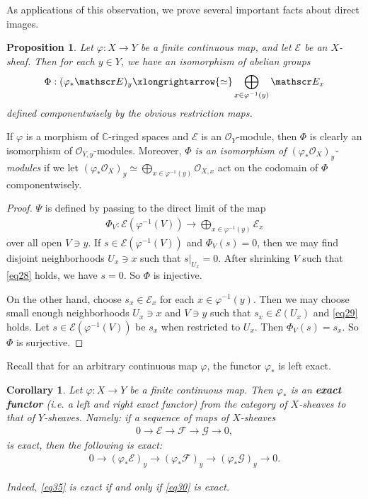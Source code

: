 \documentclass[12pt,b5paper,notitlepage]{report}
\theoremstyle{definition}
\theoremstyle{plain}
\newtheorem{pp}[df]{Proposition}
\newtheorem{co}[df]{Corollary}
\newcommand{\scr}{\mathscr}
\newcommand{\Cbb}{\mathbb C}
\numberwithin{equation}{section}
\begin{document}
As applications of this observation, we prove several important facts about direct images.

\begin{pp}\label{lb56}
Let $\varphi:X\rightarrow Y$ be a finite continuous map, and let $\scr E$ be an $X$-sheaf. Then for each $y\in Y$, we have an isomorphism of abelian groups
\begin{align}\label{eq27}
\Phi:(\varphi_*\scr E)_y\xlongrightarrow{\simeq} \bigoplus_{x\in\varphi^{-1}(y)}\scr E_x
\end{align}
defined componentwisely by the obvious restriction maps.
\end{pp}
If $\varphi$ is a morphism of $\Cbb$-ringed spaces and $\scr E$ is an $\scr O_Y$-module, then $\Phi$ is clearly an isomorphism of $\scr O_{Y,y}$-modules. Moreover, \emph{$\Phi$ is an isomorphism of $(\varphi_*\scr O_X)_y$-modules} if we let $(\varphi_*\scr O_X)_y\simeq\bigoplus_{x\in\varphi^{-1}(y)}\scr O_{X,x}$ act on the codomain of $\Phi$ componentwisely.

\begin{proof}
$\Psi$ is defined by passing to the direct limit of the map
\begin{align}
\Phi_V:\scr E(\varphi^{-1}(V))\rightarrow\bigoplus_{x\in\varphi^{-1}(y)}\scr E_x
\end{align}
over all open $V\ni y$. If $s\in\scr E(\varphi^{-1}(V))$ and $\Phi_V(s)=0$, then we may find disjoint neighborhoods $U_x\ni x$ such that $s|_{U_x}=0$. After shrinking $V$ such that \eqref{eq28} holds, we have $s=0$. So $\Phi$ is injective.

On the other hand, choose $s_x\in\scr E_x$ for each $x\in\varphi^{-1}(y)$. Then we may choose small enough neighborhoods $U_x\ni x$ and $V\ni y$ such that $s_x\in\scr E(U_x)$ and \eqref{eq29} holds. Let $s\in\scr E(\varphi^{-1}(V))$ be $s_x$ when restricted to $U_x$. Then $\Phi_V(s)=s_x$. So $\Phi$ is surjective.
\end{proof}

Recall that for an arbitrary continuous map $\varphi$, the functor $\varphi_*$ is left exact.

\begin{co}\label{lb71}
Let $\varphi:X\rightarrow Y$ be a finite continuous map. Then $\varphi_*$ is an \textbf{exact functor} (i.e. a left and right exact functor) from the category of $X$-sheaves to that of $Y$-sheaves.  Namely: if a sequence of maps of $X$-sheaves
\begin{align}
0\rightarrow\scr E\rightarrow\scr F\rightarrow\scr G\rightarrow0,\label{eq35}
\end{align}
is exact, then the following is exact:
\begin{align}
0\rightarrow(\varphi_*\scr E)_y\rightarrow(\varphi_*\scr F)_y\rightarrow(\varphi_*\scr G)_y\rightarrow0.\label{eq30}
\end{align}


Indeed, \eqref{eq35} is exact if and only if \eqref{eq30} is exact.
\end{co}
\end{document}
